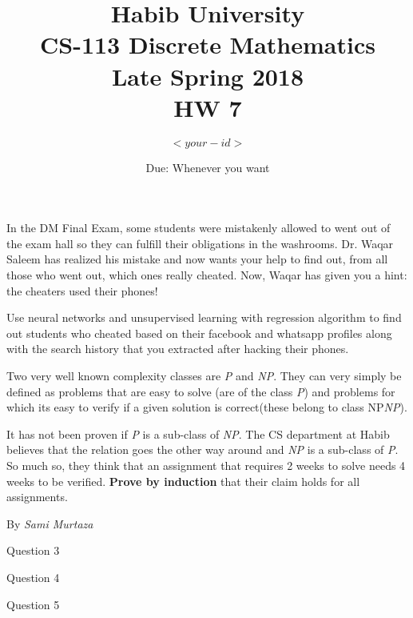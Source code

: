 \documentclass[addpoints]{exam}
\title{Habib University\\CS-113 Discrete Mathematics\\Late Spring 2018\\HW 7}
\author{$<your-id>$}  %
\date{Due: Whenever you want}
\begin{document}
\maketitle

\begin{questions}



\question
In the DM Final Exam, some students were mistakenly allowed to went out of the exam hall so they can fulfill their obligations in the washrooms. Dr. Waqar Saleem has realized his mistake and now wants your help to find out, from all those who went out, which ones really cheated. Now, Waqar has given you a hint: the cheaters used their phones! 

Use neural networks and unsupervised learning with regression algorithm to find out students who cheated based on their facebook and whatsapp profiles along with the search history that you extracted after hacking their phones.
  \begin{solution}
    
  \end{solution}

\question 
Two very well known complexity classes are \textit{P} and \textit{NP}. They can very simply be defined as problems that are easy to solve (are of the class \textit{P}) and problems for which its easy to verify if a given solution is correct(these belong to class NP\textit{NP}).

It has not been proven if \textit{P} is a sub-class of \textit{NP}. The CS department at Habib believes that the relation goes the other way around and \textit{NP} is a sub-class of \textit{P}. So much so, they think that an assignment that requires 2 weeks to solve needs 4 weeks to be verified. \textbf{Prove by induction} that their claim holds for all assignments.


By \textit{Sami Murtaza}


  \begin{solution}
	
  \end{solution}
  
\question 
Question 3

  \begin{solution}
  
  \end{solution}

\question
Question 4

  \begin{solution}
			
  \end{solution}

\question 
Question 5

	\begin{solution}
	\end{solution}


\end{questions}
\end{document}
